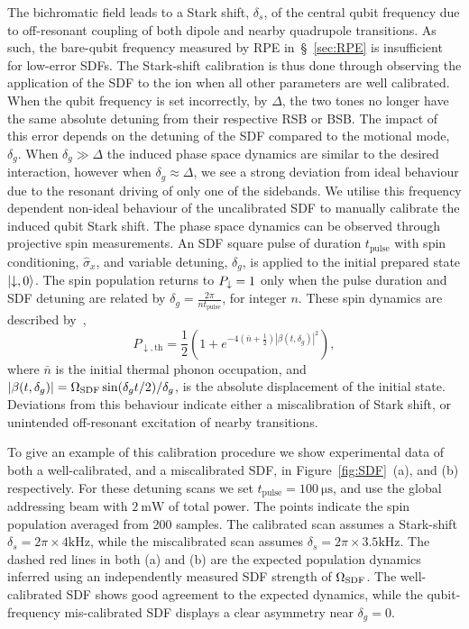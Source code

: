     The bichromatic field leads to a Stark shift, $\delta_s$, of the central qubit frequency due to off-resonant coupling of both dipole and nearby quadrupole transitions. As such, the bare-qubit frequency measured by RPE in~\S~\ref{sec:RPE} is insufficient for low-error SDFs.
    The Stark-shift calibration is thus done through observing the application of the SDF to the ion when all other parameters are well calibrated.
    When the qubit frequency is set incorrectly, by $\Delta$, the two tones no
    longer have the same absolute detuning from their respective RSB or BSB. The impact of this error depends on the detuning of the SDF compared to the motional mode, $\delta_g$. When $\delta_g \gg \Delta$ the induced phase space dynamics are similar to the desired interaction, however when $\delta_g \approx \Delta$, we see a strong deviation from ideal behaviour due to the resonant driving of only one of the sidebands. We utilise this frequency dependent non-ideal behaviour of the uncalibrated SDF to manually calibrate the induced qubit Stark shift.  
    The phase space dynamics can be observed through projective spin measurements. 
    An SDF square pulse of duration $t_\mathrm{pulse}$ with spin conditioning, $\hat\sigma_x$, and variable detuning, $\delta_g$, is applied to the initial prepared state $\ket{\downarrow,0}$.
    The spin population returns to $P_\downarrow=1$ only when the pulse duration and SDF detuning are related by $\delta_g = \frac{2\pi}{nt_\mathrm{pulse}}$, for integer $n$. These spin dynamics are described by~\cite{burd_squeezing_2020},
    \begin{equation}
        \label{eqn:sdf_pop}
        P_{\downarrow,\mathrm{th}} = \frac{1}{2} \left( 1 + e^{-4\left( \bar{n} + \frac{1}{2} \right) |\beta(t, \delta_g)|^2} \right),
    \end{equation}
    where $\bar{n}$ is the initial thermal phonon occupation, and $|\beta(t, \delta_g)| = \Omega_{\rm SDF} \sin(\delta_g t/2)/\delta_g$, is the absolute displacement of the initial state. Deviations from this behaviour indicate either a miscalibration of Stark shift, or unintended off-resonant excitation of nearby transitions.

    To give an example of this calibration procedure we show experimental data of both a well-calibrated, and a miscalibrated SDF, in Figure~\ref{fig:SDF}~(a), and (b) respectively. For these detuning scans we set $t_\mathrm{pulse}=100~\unit{\micro\second}$, and use the global addressing beam with $2~\unit{\milli\watt}$ of total power. The points indicate the spin population averaged from 200 samples. The calibrated scan assumes a Stark-shift $\delta_s=2\pi\times4\unit{\kilo\hertz}$, while the miscalibrated scan assumes $\delta_s=2\pi\times3.5\unit{\kilo\hertz}$.
    The dashed red lines in both (a) and (b) are the expected population dynamics inferred using an independently measured SDF strength of $\Omega_{\rm SDF}$. The well-calibrated SDF shows good agreement to the expected dynamics, while the qubit-frequency mis-calibrated SDF displays a clear asymmetry near $\delta_g=0$.

